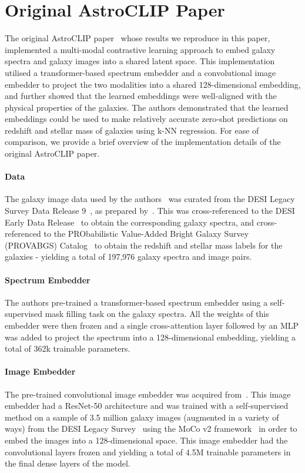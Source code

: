 
\section{Original AstroCLIP Paper}\label{sec:original-paper}
The original AstroCLIP paper~\citep{astroclip} whose results we reproduce in this paper, implemented a multi-modal contrastive
learning approach to embed galaxy spectra and galaxy images into a shared latent space.
This implementation utilised a transformer-based spectrum embedder and a convolutional image embedder to project the two
modalities into a shared 128-dimensional embedding, and further showed that the learned embeddings were well-aligned
with the physical properties of the galaxies.
The authors demonstrated that the learned embeddings could be used to make relatively accurate zero-shot predictions on
redshift and stellar mass of galaxies using k-NN regression.
For ease of comparison, we provide a brief overview of the implementation details of the original AstroCLIP paper.

\paragraph{Data} The galaxy image data used by the authors~\citep{astroclip} was curated from the DESI Legacy Survey Data
Release 9~\citep{desilegacy2018}, as prepared by~\cite{stein2021}.
This was cross-referenced to the DESI Early Data Release~\citep{desiearly2023} to obtain the corresponding galaxy spectra,
and cross-referenced to the PRObabilistic Value-Added Bright Galaxy Survey (PROVABGS) Catalog~\citep{provabgs2021}
to obtain the redshift and stellar mass labels for the galaxies - yielding a total of 197,976 galaxy spectra and image pairs.

\paragraph{Spectrum Embedder} The authors pre-trained a transformer-based spectrum embedder using a self-supervised mask
filling task on the galaxy spectra.
All the weights of this embedder were then frozen and a single cross-attention layer followed by an MLP was added to project
the spectrum into a 128-dimensional embedding, yielding a total of 362k trainable parameters.

\paragraph{Image Embedder} The pre-trained convolutional image embedder was acquired from~\cite{stein2021}.
This image embedder had a ResNet-50 architecture and was trained with a self-supervised method on a sample of 3.5 million
galaxy images (augmented in a variety of ways) from the DESI Legacy Survey~\citep{desilegacy2018} using the MoCo v2
framework~\citep{moco2020, mocov22020} in order to embed the images into a 128-dimensional space.
This image embedder had the convolutional layers frozen and yielding a total of 4.5M trainable parameters in the final
dense layers of the model.

